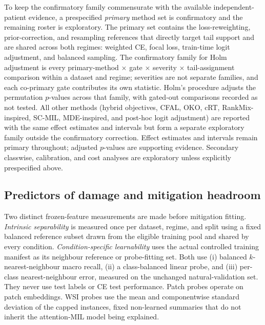 \documentclass[11pt]{article}
\begin{document}
To keep the confirmatory family commensurate with the available independent-patient evidence, a prespecified \emph{primary} method set is confirmatory and the remaining roster is exploratory. The primary set contains the loss-reweighting, prior-correction, and resampling references that directly target tail support and are shared across both regimes: weighted CE, focal loss, train-time logit adjustment, and balanced sampling. The confirmatory family for Holm adjustment is every primary-method $\times$ gate $\times$ severity $\times$ tail-assignment comparison within a dataset and regime; severities are not separate families, and each co-primary gate contributes its own statistic. Holm's procedure adjusts the permutation $p$-values across that family, with gated-out comparisons recorded as not tested. All other methods (hybrid objectives, CFAL, OKO, cRT, RankMix-inspired, SC-MIL, MDE-inspired, and post-hoc logit adjustment) are reported with the same effect estimates and intervals but form a separate exploratory family outside the confirmatory correction. Effect estimates and intervals remain primary throughout; adjusted $p$-values are supporting evidence. Secondary classwise, calibration, and cost analyses are exploratory unless explicitly prespecified above.

\subsection{Predictors of damage and mitigation headroom}
Two distinct frozen-feature measurements are made before mitigation fitting. \emph{Intrinsic separability} is measured once per dataset, regime, and split using a fixed balanced reference subset drawn from the eligible training pool and shared by every condition. \emph{Condition-specific learnability} uses the actual controlled training manifest as its neighbour reference or probe-fitting set. Both use (i) balanced $k$-nearest-neighbour macro recall, (ii) a class-balanced linear probe, and (iii) per-class nearest-neighbour error, measured on the unchanged natural-validation set. They never use test labels or CE test performance. Patch probes operate on patch embeddings. WSI probes use the mean and componentwise standard deviation of the capped instances, fixed non-learned summaries that do not inherit the attention-MIL model being explained.
\end{document}
